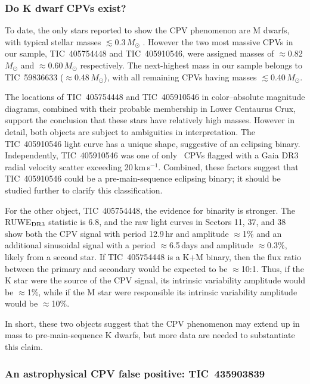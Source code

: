 \documentclass[11pt,twocolumn,tighten]{aastex63}
\newcommand{\kms}{{km\,s$^{-1}$}}
\begin{document}
\subsubsection{Do K dwarf CPVs exist?}
\label{subsec:massive}

To date, the only stars reported to show the CPV phenomenon are M
dwarfs, with typical stellar masses $\lesssim$0.3\,$M_\odot$
\citep{2017AJ....153..152S,2022AJ....163..144G}.  However the two most
massive CPVs in our sample, TIC~405754448 and TIC~405910546, were
assigned masses of $\approx$0.82\,$M_\odot$ and
$\approx$0.60\,$M_\odot$ respectively.  The next-highest mass in our
sample belongs to TIC~59836633 ($\approx$0.48\,$M_\odot$), with all
remaining CPVs having masses $\lesssim$0.40\,$M_\odot$.

The locations of TIC~405754448 and TIC~405910546 in color--absolute
magnitude diagrams, combined with their probable membership in Lower
Centaurus Crux, support the conclusion that these stars have
relatively high masses.  However in detail, both objects are subject
to ambiguities in interpretation.  The TIC~405910546 light curve has a
unique shape, suggestive of an eclipsing binary.  Independently,
TIC~405910546 was one of only \nrvscatterflag\ CPVs flagged with a
Gaia DR3 radial velocity scatter exceeding 20\,\kms.  Combined, these
factors suggest that TIC~405910546 could be a pre-main-sequence
eclipsing binary; it should be studied further to clarify this
classification.

For the other object, TIC~405754448, the evidence for binarity is
stronger.  The RUWE$_{\rm DR3}$ statistic is 6.8, and the raw light
curves in Sectors 11, 37, and 38 show both the CPV signal with period
12.9\,hr and amplitude $\approx$1\% and an additional sinusoidal
signal with a period $\approx$6.5\,days and amplitude $\approx$0.3\%,
likely from a second star.  If TIC~405754448 is a K+M binary, then the
flux ratio between the primary and secondary would be expected to be
$\approx$10:1.  Thus, if the K star were the source of the CPV signal,
its intrinsic variability amplitude would be $\approx$1\%, while if
the M star were responsible its intrinsic variability amplitude would
be $\approx$10\%.

In short, these two objects suggest that the CPV phenomenon may extend
up in mass to pre-main-sequence K dwarfs, but more data are needed to
substantiate this claim.


\subsubsection{An astrophysical CPV false positive: TIC~435903839}
\end{document}
